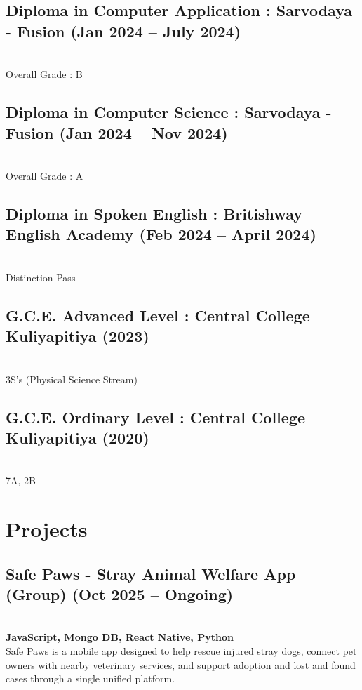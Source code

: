 \documentclass[a4paper,10pt]{article}
\begin{document}
\subsection*{Diploma in Computer Application : Sarvodaya - Fusion \hfill (Jan 2024 – July 2024)}
\textit{}\\
{Overall Grade : B} 

\subsection*{Diploma in Computer Science : Sarvodaya - Fusion \hfill (Jan 2024 – Nov 2024)}
\textit{}\\
{Overall Grade : A}

\subsection*{Diploma in Spoken English : Britishway English Academy \hfill (Feb 2024 – April 2024)}
\textit{}\\
{Distinction Pass}

\subsection*{G.C.E. Advanced Level : Central College Kuliyapitiya \hfill (2023)}
\textit{}\\
{3S's (Physical Science Stream)} 

\subsection*{G.C.E. Ordinary Level : Central College Kuliyapitiya \hfill (2020)}
\textit{}\\
7A, 2B 

\section*{ Projects}

\subsection*{Safe Paws - Stray Animal Welfare App (Group) \hfill(Oct 2025 – Ongoing)}\textit{}\\
{\bfseries\color{verdeolivo} JavaScript, Mongo DB, React Native, Python}
\textit{}\\
Safe Paws is a mobile app designed to help rescue injured stray dogs, connect pet owners with nearby veterinary services, and support adoption and lost and found cases through a single unified platform.
\end{document}

